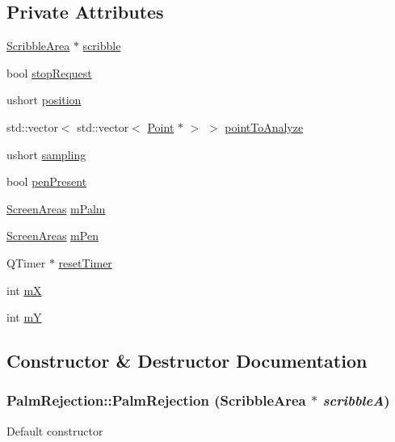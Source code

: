 \subsection*{Private Attributes}
\begin{DoxyCompactItemize}
\item 
\hyperlink{classScribbleArea}{ScribbleArea} $\ast$ \hyperlink{classPalmRejection_a8aceeaa0e01f8c54e89456567eec6ed7}{scribble}
\item 
bool \hyperlink{classPalmRejection_a654fb0955480511cebd26e5b70fd0fb5}{stopRequest}
\item 
ushort \hyperlink{classPalmRejection_afe0f2762c13a240ab57d3930e1e82c58}{position}
\item 
std::vector$<$ std::vector$<$ \hyperlink{classPoint}{Point} $\ast$ $>$ $>$ \hyperlink{classPalmRejection_aca8591fbe18eeb78ab3313b247f66df1}{pointToAnalyze}
\item 
ushort \hyperlink{classPalmRejection_a80fc5d64b9940d255d1ae0103d2728c5}{sampling}
\item 
bool \hyperlink{classPalmRejection_a1ad40a788580a676a8e0e1c85e978474}{penPresent}
\item 
\hyperlink{classScreenAreas}{ScreenAreas} \hyperlink{classPalmRejection_a037353747681e2cd2c74e49059b4cbec}{mPalm}
\item 
\hyperlink{classScreenAreas}{ScreenAreas} \hyperlink{classPalmRejection_a0a6801e29187ae5fef583227e68fec07}{mPen}
\item 
QTimer $\ast$ \hyperlink{classPalmRejection_ab9e256f39aa8f031fc38f3ba4d093539}{resetTimer}
\item 
int \hyperlink{classPalmRejection_a569d496191e767a5c46914c2552da635}{mX}
\item 
int \hyperlink{classPalmRejection_a13ff8711ff678910f89b5a42a5659c32}{mY}
\end{DoxyCompactItemize}


\subsection{Constructor \& Destructor Documentation}
\hypertarget{classPalmRejection_abe50f2e20ae5dc116a617d034d14529b}{
\subsubsection[{PalmRejection}]{\setlength{\rightskip}{0pt plus 5cm}PalmRejection::PalmRejection ({\bf ScribbleArea} $\ast$ {\em scribbleA})}}
\label{classPalmRejection_abe50f2e20ae5dc116a617d034d14529b}
Default constructor


